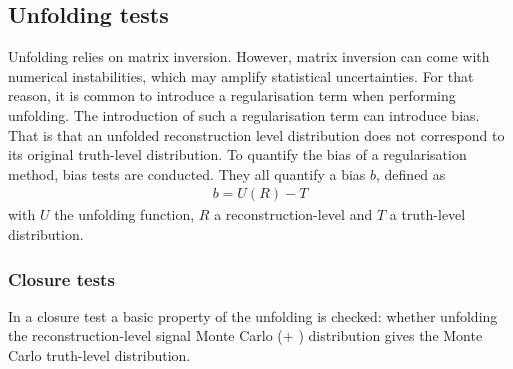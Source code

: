 \subsection{Unfolding tests}%
\label{sec:unfolding-tests}

Unfolding relies on matrix inversion. However, matrix inversion can come with numerical instabilities, which may amplify statistical uncertainties.
For that reason, it is common to introduce a regularisation term when performing unfolding. The introduction of such a regularisation term can introduce
bias. That is that an unfolded reconstruction level distribution does not correspond to its original truth-level distribution. To quantify the bias of
a regularisation method, bias tests are conducted. They all quantify a bias \(b\), defined as
\begin{align*}
 b = U(R) - T
\end{align*}
with \(U\) the unfolding function, \(R\) a reconstruction-level and \(T\) a truth-level distribution.

\subsubsection{Closure tests}
In a closure test a basic property of the unfolding is checked: whether unfolding the reconstruction-level signal Monte Carlo (\ttbar \(+\) \tW) distribution gives the Monte Carlo truth-level distribution.

